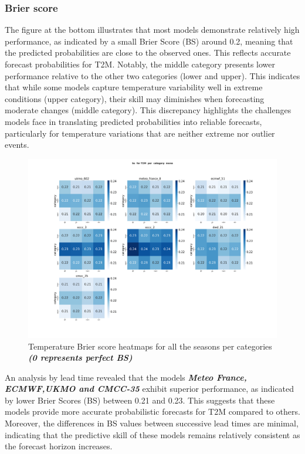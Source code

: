 \subsubsection{Brier score}

The figure at the bottom illustrates that most models demonstrate relatively high performance, as indicated by a small Brier Score (BS) around 0.2, meaning that the predicted probabilities are close to the observed ones. This reflects accurate forecast probabilities for T2M. Notably, the middle category presents lower performance relative to the other two categories (lower and upper). This indicates that while some models capture temperature variability well in extreme conditions (upper category), their skill may diminishes when forecasting moderate changes (middle category). This discrepancy highlights the challenges models face in translating predicted probabilities into reliable forecasts, particularly for temperature variations that are neither extreme nor outlier events. 


\begin{figure}[H]
    \centering
    \includegraphics[width=1\linewidth]{plots/prob/bs/bs_T2M_category_mena.png}
    \caption{Temperature Brier score heatmaps for all the seasons per categories \textbf{\textit{(0 represents perfect BS)} }}
\end{figure}

An analysis by lead time revealed that the models \textbf{\textit{ Meteo France, ECMWF,UKMO  and CMCC-35 }} exhibit superior performance, as indicated by lower Brier Scores (BS) between 0.21 and 0.23. This suggests that these models provide more accurate probabilistic forecasts for T2M compared to others. Moreover, the differences in BS values between successive lead times are minimal, indicating that the predictive skill of these models remains relatively consistent as the forecast horizon increases.

